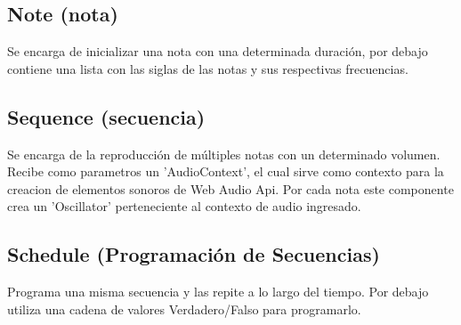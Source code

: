 \subsection{Note (nota)}
Se encarga de inicializar una nota con una determinada duración,
por debajo contiene una lista con las siglas de las notas y sus respectivas
frecuencias.
\subsection{Sequence (secuencia)}
Se encarga de la reproducción de múltiples notas con un determinado
volumen. Recibe como parametros un 'AudioContext', el cual sirve como
contexto para la creacion de elementos sonoros de Web Audio Api. Por
cada nota este componente crea un 'Oscillator' perteneciente al
contexto de audio ingresado.
\subsection{Schedule (Programación de Secuencias)}
Programa una misma secuencia y las repite a lo largo del tiempo.
Por debajo utiliza una cadena de valores Verdadero/Falso para programarlo.
